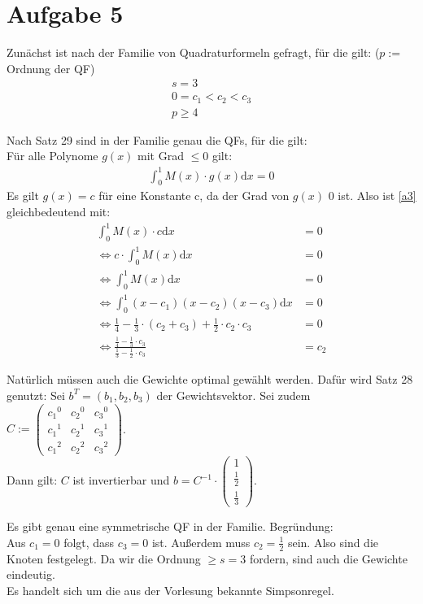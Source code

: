 \section*{Aufgabe 5}

Zunächst ist nach der Familie von Quadraturformeln gefragt, für die gilt: ($p := $ Ordnung der QF)
\begin{align}
	s = 3 \\
	0 = c_1 < c_2 < c_3 \\
	p \ge 4
\end{align}

Nach Satz 29 sind in der Familie genau die QFs, für die gilt: \\
Für alle Polynome $g(x)$ mit Grad $\le 0$ gilt:
\begin{align}
	 \int_0^1 M(x) \cdot g(x) \mathrm{d}x = 0 \label{a3}
\end{align}
Es gilt $g(x) = c$ für eine Konstante c, da der Grad von $g(x)$ $0$ ist. Also ist \ref{a3} gleichbedeutend mit:
\begin{align}
	 \int_0^1 M(x) \cdot c \mathrm{d}x &= 0 \\
	 \Leftrightarrow c \cdot \int_0^1 M(x) \mathrm{d}x &= 0 \\
 	 \Leftrightarrow \int_0^1 M(x) \mathrm{d}x &= 0 \\
 	 \Leftrightarrow \int_0^1 (x-c_1)(x-c_2)(x-c_3) \mathrm{d}x &= 0 \\
 	 \Leftrightarrow \frac{1}{4} - \frac{1}{3} \cdot (c_2 + c_3) + \frac{1}{2} \cdot c_2 \cdot c_3 &= 0 \\
 	 \Leftrightarrow \frac{\frac{1}{4} - \frac{1}{3} \cdot c_3}
 	                      {\frac{1}{3} - \frac{1}{2} \cdot c_3} &= c_2
\end{align}

Natürlich müssen auch die Gewichte optimal gewählt werden. Dafür wird Satz 28 genutzt:
Sei $b^T = (b_1, b_2, b_3)$ der Gewichtsvektor. Sei zudem $C :=
\begin{pmatrix}
    {c_1}^0 & {c_2}^0 & {c_3}^0 \\
    {c_1}^1 & {c_2}^1 & {c_3}^1 \\
    {c_1}^2 & {c_2}^2 & {c_3}^2
\end{pmatrix}
$. \\
Dann gilt: $C$ ist invertierbar und $b = C^{-1} \cdot
\begin{pmatrix}
    1 \\
    \frac{1}{2} \\
    \frac{1}{3}
\end{pmatrix}
$.

Es gibt genau eine symmetrische QF in der Familie. Begründung: \\
Aus $c_1 = 0 $ folgt, dass $c_3 = 0$ ist. Außerdem muss $c_2 = \frac{1}{2} $ sein. Also sind die Knoten festgelegt. Da wir die Ordnung $\ge s = 3$ fordern, sind auch die Gewichte eindeutig. \\
Es handelt sich um die aus der Vorlesung bekannte Simpsonregel.

